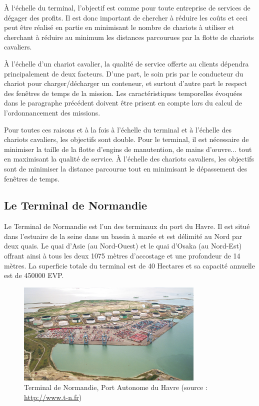 À l`échelle du terminal, l'objectif est comme pour toute entreprise de services de dégager des profits.
Il est donc important de chercher à réduire les coûts et ceci peut être réalisé en partie en minimisant le nombre de chariots à utiliser et cherchant à réduire au minimum les distances parcourues par la flotte de chariots cavaliers.

À l'échelle d'un chariot cavalier, la qualité de service offerte au clients dépendra principalement de deux facteurs. D'une part, le soin pris par le conducteur du chariot pour charger/décharger un conteneur, et surtout d'autre part le respect des fenêtres de temps de la mission. Les caractéristiques temporelles évoquées dans le paragraphe précédent doivent être prisent en compte lors du calcul de l'ordonnancement des missions.

Pour toutes ces raisons et à la fois à l'échelle du terminal et à l'échelle des chariots cavaliers, les objectifs sont double. Pour le terminal, il est nécessaire de minimiser la taille de la flotte d'engins de manutention, de mains d’œuvre... tout en maximisant la qualité de service. À l'échelle des chariots cavaliers, les objectifs sont de minimiser la distance parcourue tout en minimisant le dépassement des fenêtres de temps.

\subsection{Le Terminal de Normandie}

Le Terminal de Normandie est l'un des terminaux du port du Havre. 
Il est situé dans l'estuaire de la seine dans un bassin à marée et est délimité au Nord par deux quais. Le quai d'Asie (au Nord-Ouest) et le quai d'Osaka (au Nord-Est) offrant ainsi à tous les deux 1075 mètres d'accostage et une profondeur de 14 mètres.
La superficie totale du terminal est de 40 Hectares et sa capacité annuelle est de 450000 EVP.

\begin{figure}[ht]
  \begin{center}
    \includegraphics[width=0.8\textwidth]{chapitres/application/terminalDeNormandie.jpg}
    \caption{Terminal de Normandie, Port Autonome du Havre (source : \url{http://www.t-n.fr})}
    \label{fig:TN}
 \end{center}
\end{figure}

